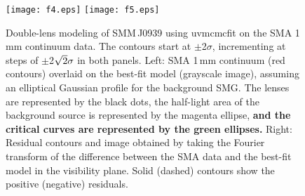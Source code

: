 \documentclass[iop, revtex4]{emulateapj}
\begin{document}

\begin{figure}[!tbpH]
\centering
\texttt{[image: f4.eps]}
\texttt{[image: f5.eps]}
\caption{Double-lens modeling of SMM\,J0939 using {\sc uvmcmcfit} on the SMA 1\,mm continuum data.
The contours start at $\pm$2$\sigma$, incrementing at
steps of $\pm$2$\sqrt{\rm 2}\sigma$ in both panels. Left: SMA 1\,mm continuum (red contours) overlaid on the best-fit model (grayscale image), assuming an elliptical Gaussian profile for the background SMG. The lenses are represented by the black dots, the half-light area of the background source is represented by the magenta ellipse, {\bf and the critical curves are represented by the green ellipses.}
Right: Residual contours and image obtained by taking the Fourier transform of the difference between the SMA data and the best-fit model in the visibility plane. Solid (dashed) contours show the positive (negative) residuals.\label{fig:lens}}
\end{figure}
\end{document}
